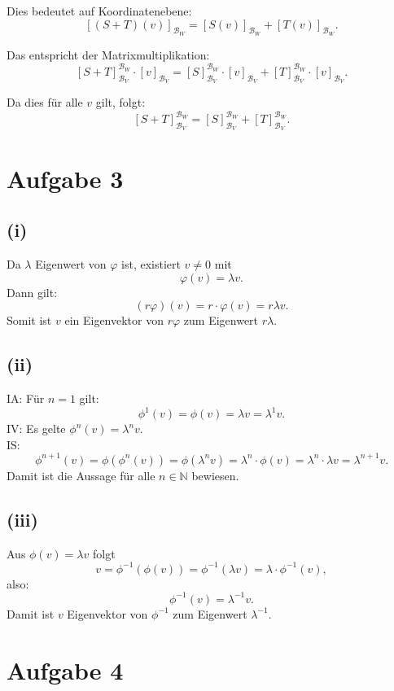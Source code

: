 \documentclass{article}
\begin{document}
Dies bedeutet auf Koordinatenebene:
\[
[(S+T)(v)]_{\mathcal{B}_W} = [S(v)]_{\mathcal{B}_W} + [T(v)]_{\mathcal{B}_W}.
\]

Das entspricht der Matrixmultiplikation:
\[
[S+T]_{\mathcal{B}_V}^{\mathcal{B}_W} \cdot [v]_{\mathcal{B}_V} = [S]_{\mathcal{B}_V}^{\mathcal{B}_W} \cdot [v]_{\mathcal{B}_V} + [T]_{\mathcal{B}_V}^{\mathcal{B}_W} \cdot [v]_{\mathcal{B}_V}.
\]

Da dies für alle \( v \) gilt, folgt:
\[
[S+T]_{\mathcal{B}_V}^{\mathcal{B}_W} = [S]_{\mathcal{B}_V}^{\mathcal{B}_W} + [T]_{\mathcal{B}_V}^{\mathcal{B}_W}.
\]

\section*{Aufgabe 3}
\subsection*{(i)}
Da \( \lambda \) Eigenwert von \( \varphi \) ist, existiert \( v \neq 0 \) mit
\[
\varphi(v) = \lambda v.
\]
Dann gilt:
\[
(r\varphi)(v) = r \cdot \varphi(v) = r \lambda v.
\]
Somit ist \( v \) ein Eigenvektor von \( r\varphi \) zum Eigenwert \( r\lambda \).

\subsection*{(ii)}
IA: Für \(n = 1\) gilt:
\[
\phi^1(v) = \phi(v) = \lambda v = \lambda^1 v.
\]
IV: Es gelte \(\phi^n(v) = \lambda^n v\).\\
IS:
\[
\phi^{n+1}(v) = \phi(\phi^n(v)) = \phi(\lambda^n v) = \lambda^n \cdot \phi(v) = \lambda^n \cdot \lambda v = \lambda^{n+1} v.
\]
Damit ist die Aussage für alle \(n \in \mathbb{N}\) bewiesen.

\subsection*{(iii)}
Aus \(\phi(v) = \lambda v\) folgt
\[
v = \phi^{-1}(\phi(v)) = \phi^{-1}(\lambda v) = \lambda \cdot \phi^{-1}(v),
\]
also:
\[
\phi^{-1}(v) = \lambda^{-1} v.
\]
Damit ist \(v\) Eigenvektor von \(\phi^{-1}\) zum Eigenwert \(\lambda^{-1}\).

\section*{Aufgabe 4}
\end{document}
